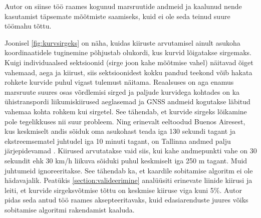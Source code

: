 Autor on siinse töö raames kogunud marsruutide andmeid ja kaalunud nende kasutamist täpsemate mõõtmiste saamiseks, kuid ei ole seda teinud suure töömahu tõttu.

Joonisel \ref{fig:kurvsirgeks} on näha, kuidas kiiruste arvutamisel ainult asukoha koordinaatidele tuginemine põhjustab olukordi, kus kurvid lõigatakse sirgemaks. Kuigi individuaalsed sektsioonid (sirge joon kahe mõõtmise vahel) näitavad õiget vahemaad, aega ja kiirust, siis sektsioonidest kokku pandud teekond võib hakata rohkete kurvide puhul vigast tulemust näitama. Reaalsuses on aga enamus marsruute suures osas võrdlemisi sirged  ja paljude kurvidega kohtades on ka ühistranspordi liikumiskiirused aeglasemad ja GNSS andmeid kogutakse läbitud vahemaa kohta rohkem kui sirgetel. See tähendab, et kurvide sirgeks lõikamine pole tegelikkuses nii suur probleem. Ning erinevalt eeltoodud Buenos Airesest, kus keskmiselt andis sõiduk oma asukohast teada iga 130 sekundi tagant ja ekstreemsematel juhtudel iga 10 minuti tagant, on Tallinna andmed palju järjepidevamad \cite{buenosAires}. Kiirused arvutatakse vaid siis, kui kahe andmepunkti vahe on 30 sekundit ehk 30 km/h liikuva sõiduki puhul keskmiselt iga 250 m tagant. Muid juhtumeid ignoreeritakse. See tähendab ka, et kaardile sobitamise algoritm ei ole hädavajalik. 
Peatükis \ref{section:valideerimine} analüüsiti erinevate liinide kiirusi ja leiti, et kurvide sirgeksvõtmise tõttu on keskmise kiiruse viga kuni 5\%. Autor pidas seda antud töö raames aksepteeritavaks, kuid edasiarenduste juures võiks sobitamise algoritmi rakendamist kaaluda.